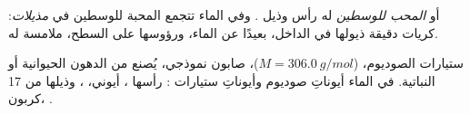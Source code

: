 \begin{definition}\label{def:g11:dissolution:amphiphilic}
 أو  \emph{المحب للوسطين} له رأس 
وذيل . وفي الماء تتجمع  المحبة للوسطين في
\emph{مذيلات}: كريات دقيقة ذيولها في الداخل، بعيدًا عن الماء،
ورؤوسها على السطح، ملامسة له.
\end{definition}

\begin{example}[صابون]\label{ex:g11:dissolution:soap}
ستيارات الصوديوم،  ($M = \qty{306.0}{g/mol}$)، صابون
نموذجي، يُصنع من الدهون الحيوانية أو النباتية.  في الماء أيوناتِ صوديوم
 وأيوناتِ ستيارات : رأسها
، أيوني، ، وذيلها من 17  كربون،
.
\end{example}

